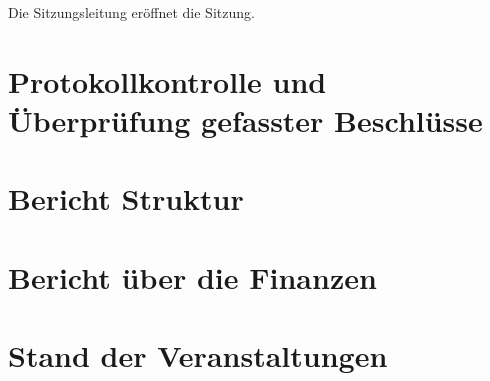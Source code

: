 \documentclass{fsrprotokoll}
\begin{document}

\date{}  %
\attendeesNumber{}  %
\chairperson{}
\clerks{}
\meetingStart{}  %
\meetingEnd{}  %
\attendees{}
\excused{}
\unexcused{}
\resting{}

\maketitle

Die Sitzungsleitung eröffnet die Sitzung.

\quorum{}{} %

\section{Protokollkontrolle und Überprüfung gefasster Beschlüsse}


\section{Bericht Struktur}

\section{Bericht über die Finanzen}



\section{Stand der Veranstaltungen}
\end{document}
